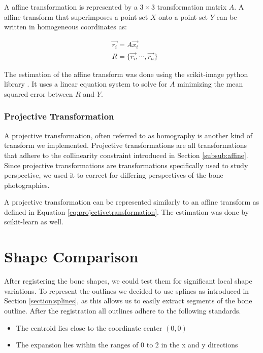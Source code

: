 \documentclass[pdftex,12pt,a4paper]{report}
\begin{document}
A affine transformation is represented by a $3\times3$ transformation matrix $A$. A affine transform that
superimposes a point set $X$ onto a point set $Y$ can be written in homogeneous coordinates as:

\begin{equation}
\label{eq:projectivetransformation}
\begin{split}
& \vec{r_i} = A \vec{x_i} \\
& R = \{ \vec{r_i}, \cdots, \vec{r_n} \}
\end{split}
\end{equation}

The estimation of the affine transform was done using the scikit-image python library \cite{van2014scikit}.
It uses a linear equation system to solve for $A$ minimizing the mean squared error between $R$ and $Y$.

\subsubsection{Projective Transformation}

A projective transformation, often referred to as homography is another kind of transform we implemented.
Projective transformations are all transformations that adhere to the collinearity constraint introduced
in Section \ref{subsub:affine}. Since projective transformations are transformations specifically used
to study perspective, we used it to correct for differing perspectives of the bone photographies.

A projective transformation can be represented similarly to an affine transform as defined in Equation
\ref{eq:projectivetransformation}. The estimation was done by scikit-learn \cite{van2014scikit} as well. 

\section{Shape Comparison}

After registering the bone shapes, we could test them for significant local shape variations.
To represent the outlines we decided to use splines as introduced in Section \ref{section:splines},
as this allows us to easily extract segments of the bone outline. After the registration all outlines
adhere to the following standards.

\begin{itemize}
\item The centroid lies close to the coordinate center $(0,0)$
\item The expansion lies within the ranges of $0$ to $2$ in the x and y directions
\end{itemize}
\end{document}
